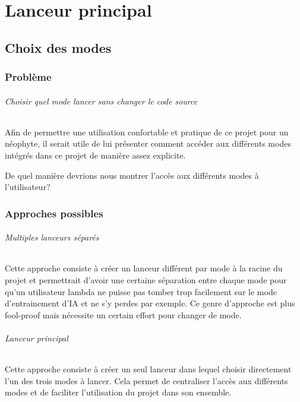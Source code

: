 \documentclass{scrreprt}
\begin{document}
			
	
\part{Lanceur principal}
	\chapter{Choix des modes}
		\section{Problème}
			\paragraph{Choisir quel mode lancer sans changer le code source}
			
			Afin de permettre une utilisation confortable et pratique de ce projet pour un néophyte, il serait utile de lui présenter comment accéder aux différents modes intégrés dans ce projet de manière assez explicite.
			
			De quel manière devrions nous montrer l'accès aux différents modes à l'utilisateur?
			
		\section{Approches possibles}
			\paragraph{Multiples lanceurs séparés}
			
			Cette approche consiste à créer un lanceur différent par mode à la racine du projet et permettrait d'avoir une certaine séparation entre chaque mode pour qu'un utilisateur lambda ne puisse pas tomber trop facilement sur le mode d'entrainement d'IA et ne s'y perdes par exemple. Ce genre d'approche est plus fool-proof mais nécessite un certain effort pour changer de mode.
			
			\paragraph{Lanceur principal}
			
			Cette approche consiste à créer un seul lanceur dans lequel choisir directement l'un des trois modes à lancer. Cela permet de centraliser l'accès aux différents modes et de faciliter l'utilisation du projet dans son ensemble.
			
\end{document}

